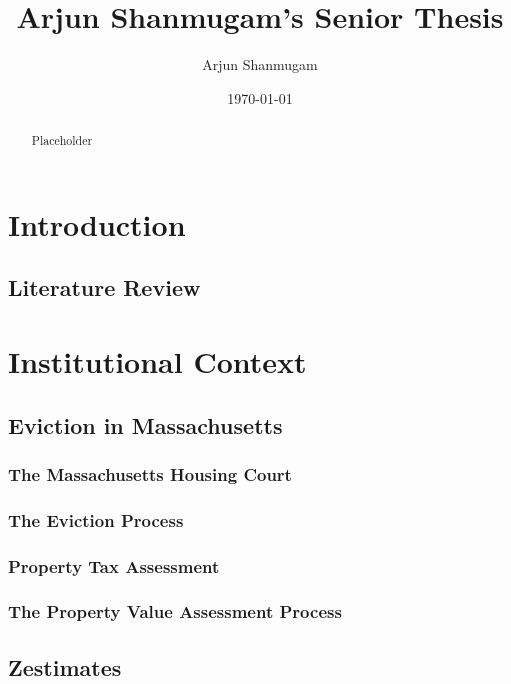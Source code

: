 \documentclass[12pt]{article}
\begin{document}
\begin{titlepage}
\title{Arjun Shanmugam's Senior Thesis}
\author{Arjun Shanmugam}
\date{\today}
\maketitle
\begin{abstract}
\noindent Placeholder\\


\bigskip
\end{abstract}
\setcounter{page}{0}
\thispagestyle{empty}
\end{titlepage}
\pagebreak \newpage




\doublespacing


\section{Introduction} \label{sec:introduction}
\subsection{Literature Review}

\section{Institutional Context}
    \subsection{Eviction in Massachusetts}
        \subsubsection{The Massachusetts Housing Court}
        \subsubsection{The Eviction Process}
    \subsubsection{Property Tax Assessment}
        \subsubsection{The Property Value Assessment Process}
    \subsection{Zestimates}
\end{document}
